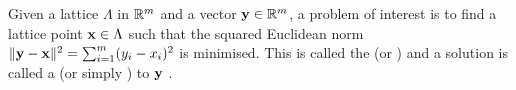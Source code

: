 \documentclass[10pt,twocolumn,twoside]{IEEEtran}
\begin{document}
Given a lattice $\Lambda$ in ${\mathbb R}^m$ and a vector $\mathbf{y} \in {\mathbb R}^m$, a problem of interest is to find a lattice point $\mathbf{x} \in \Lambda$ such that the squared Euclidean norm $\| \mathbf{y} - \mathbf{x} \|^2 = \sum_{i=1}^m (y_i - x_i)^2$ is minimised.  This is called the  (or ) and a solution is called a  (or simply ) to $\mathbf{y}$ \cite{Agrell2002}.  %
%
%
\end{document}

